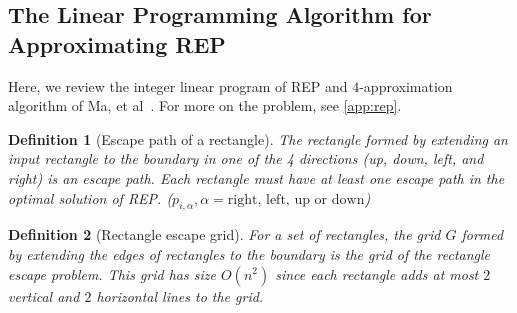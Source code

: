 \documentclass[preprint,12pt]{elsarticle}
\newtheorem{definition}{Definition}
\begin{document}
\subsection{The Linear Programming Algorithm for Approximating REP}\label{lit:rep}
Here, we review the integer linear program of REP and $4$-approximation algorithm of Ma, et al~\cite{ma}.  For more on the problem, see \ref{app:rep}.
\begin{definition}[Escape path of a rectangle]
The rectangle formed by extending an input rectangle to the boundary in one of the 4 directions (up, down, left, and right) is an escape path. Each rectangle must have at least one escape path in the optimal solution of REP. ($p_{i,\alpha}, \alpha = \text{right, left, up or down}$)
\end{definition}
\begin{definition}[Rectangle escape grid]\label{def:grid}
For a set of rectangles, the grid $G$ formed by extending the edges of rectangles to the boundary is the grid of the rectangle escape problem. This grid has size $O(n^2)$ since each rectangle adds at most $2$ vertical and $2$ horizontal lines to the grid.
\end{definition}
\end{document}
